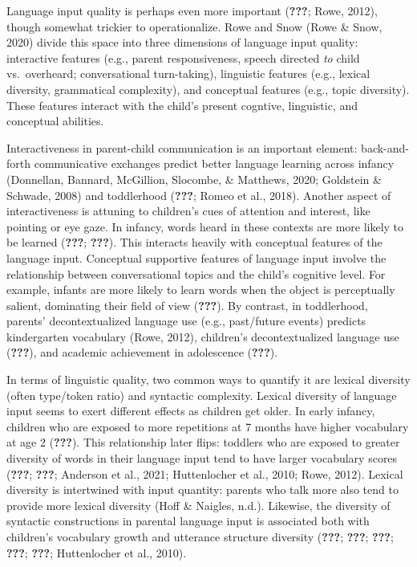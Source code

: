 \documentclass[english,man]{apa6}
\begin{document}
Language input quality is perhaps even more important ({\textbf{???}}; Rowe, 2012), though somewhat trickier to operationalize. Rowe and Snow (Rowe \& Snow, 2020) divide this space into three dimensions of language input quality: interactive features (e.g., parent responsiveness, speech directed \emph{to} child vs.~overheard; conversational turn-taking), linguistic features (e.g., lexical diversity, grammatical complexity), and conceptual features (e.g., topic diversity). These features interact with the child's present cogntive, linguistic, and conceptual abilities.

Interactiveness in parent-child communication is an important element: back-and-forth communicative exchanges predict better language learning across infancy (Donnellan, Bannard, McGillion, Slocombe, \& Matthews, 2020; Goldstein \& Schwade, 2008) and toddlerhood ({\textbf{???}}; Romeo et al., 2018). Another aspect of interactiveness is attuning to children's cues of attention and interest, like pointing or eye gaze. In infancy, words heard in these contexts are more likely to be learned ({\textbf{???}}; {\textbf{???}}). This interacts heavily with conceptual features of the language input. Conceptual supportive features of language input involve the relationship between conversational topics and the child's cognitive level. For example, infants are more likely to learn words when the object is perceptually salient, dominating their field of view ({\textbf{???}}). By contrast, in toddlerhood, parents' decontextualized language use (e.g., past/future events) predicts kindergarten vocabulary (Rowe, 2012), children's decontextualized language use ({\textbf{???}}), and academic achievement in adolescence ({\textbf{???}}).

In terms of linguistic quality, two common ways to quantify it are lexical diversity (often type/token ratio) and syntactic complexity. Lexical diversity of language input seems to exert different effects as children get older. In early infancy, children who are exposed to more repetitions at 7 months have higher vocabulary at age 2 ({\textbf{???}}). This relationship later flips: toddlers who are exposed to greater diversity of words in their language input tend to have larger vocabulary scores ({\textbf{???}}; {\textbf{???}}; Anderson et al., 2021; Huttenlocher et al., 2010; Rowe, 2012). Lexical diversity is intertwined with input quantity: parents who talk more also tend to provide more lexical diversity (Hoff \& Naigles, n.d.). Likewise, the diversity of syntactic constructions in parental language input is associated both with children's vocabulary growth and utterance structure diversity ({\textbf{???}}; {\textbf{???}}; {\textbf{???}}; {\textbf{???}}; {\textbf{???}}; Huttenlocher et al., 2010).
\end{document}
